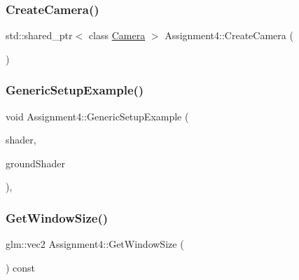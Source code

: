 \hypertarget{class_assignment4_af75a5deee12f42e4efac2c8857c7eb05}{}\label{class_assignment4_af75a5deee12f42e4efac2c8857c7eb05}
\subsubsection{\texorpdfstring{Create\+Camera()}{CreateCamera()}}
{\footnotesize\ttfamily std\+::shared\+\_\+ptr$<$ class \hyperlink{class_camera}{Camera} $>$ Assignment4\+::\+Create\+Camera (\begin{DoxyParamCaption}{ }\end{DoxyParamCaption})\hspace{0.3cm}{\ttfamily [static]}}

\hypertarget{class_assignment4_a440d520fc872a49fade29aa1eb7643d0}{}\label{class_assignment4_a440d520fc872a49fade29aa1eb7643d0}
\subsubsection{\texorpdfstring{Generic\+Setup\+Example()}{GenericSetupExample()}}
{\footnotesize\ttfamily void Assignment4\+::\+Generic\+Setup\+Example (\begin{DoxyParamCaption}\item[{std\+::shared\+\_\+ptr$<$ class \hyperlink{class_shader_program}{Shader\+Program} $>$}]{shader,  }\item[{std\+::shared\+\_\+ptr$<$ \hyperlink{class_shader_program}{Shader\+Program} $>$}]{ground\+Shader }\end{DoxyParamCaption})\hspace{0.3cm}{\ttfamily [private]}, {\ttfamily [virtual]}}

\hypertarget{class_assignment4_ad197b75e730f9b32458429df8d55458e}{}\label{class_assignment4_ad197b75e730f9b32458429df8d55458e}
\subsubsection{\texorpdfstring{Get\+Window\+Size()}{GetWindowSize()}}
{\footnotesize\ttfamily glm\+::vec2 Assignment4\+::\+Get\+Window\+Size (\begin{DoxyParamCaption}{ }\end{DoxyParamCaption}) const\hspace{0.3cm}{\ttfamily [virtual]}}



